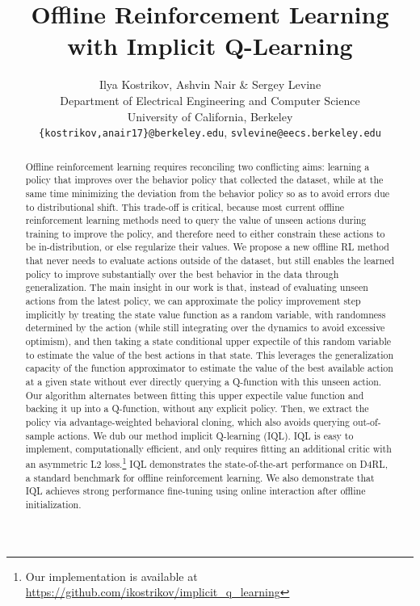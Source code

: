 \documentclass{article} %
\title{Offline Reinforcement Learning \\ with Implicit Q-Learning}
\author{Ilya Kostrikov, Ashvin Nair \& Sergey Levine \\
Department of Electrical Engineering and Computer Science \\
University of California, Berkeley \\
\texttt{\{kostrikov,anair17\}@berkeley.edu}, \texttt{svlevine@eecs.berkeley.edu} 
}
\def\ourname{IQL\xspace}
\begin{document}
\maketitle

\begin{abstract}
Offline reinforcement learning requires reconciling two conflicting aims: learning a policy that improves over the behavior policy that collected the dataset, while at the same time minimizing the deviation from the behavior policy so as to avoid errors due to distributional shift. This trade-off is critical, because most current offline reinforcement learning methods need to query the value of unseen actions during training to improve the policy, and therefore need to either constrain these actions to be in-distribution, or else regularize their values. We propose a new offline RL method that never needs to evaluate actions outside of the dataset, but still enables the learned policy to improve substantially over the best behavior in the data through generalization.
The main insight in our work is that, instead of evaluating unseen actions from the latest policy, we can approximate the policy improvement step implicitly by treating the state value function as a random variable, with randomness determined by the action (while still integrating over the dynamics to avoid excessive optimism), and then taking a state conditional upper expectile of this random variable to estimate the value of the best actions in that state. This leverages the generalization capacity of the function approximator to estimate the value of the best available action at a given state without ever directly querying a Q-function with this unseen action.
Our algorithm alternates between fitting this upper expectile value function and backing it up into a Q-function, without any explicit policy. Then, we extract the policy via advantage-weighted behavioral cloning, which also avoids querying out-of-sample actions. We dub our method implicit Q-learning (\ourname).  \ourname is easy to implement, computationally efficient, and only requires fitting an additional critic with an asymmetric L2 loss.\footnote{Our implementation is available at \href{https://github.com/ikostrikov/implicit\_policy\_improvement}{https://github.com/ikostrikov/implicit\_q\_learning}} \ourname demonstrates the state-of-the-art performance on D4RL, a standard benchmark for offline reinforcement learning.
We also demonstrate that \ourname achieves strong performance fine-tuning using online interaction after offline initialization.
\end{abstract}
\end{document}
